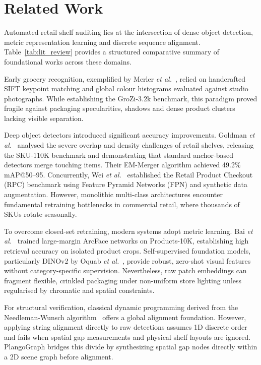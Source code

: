 \documentclass[conference]{IEEEtran}
\begin{document}
\section{Related Work}
Automated retail shelf auditing lies at the intersection of dense object detection, metric representation learning and discrete sequence alignment. Table~\ref{tab:lit_review} provides a structured comparative summary of foundational works across these domains.

Early grocery recognition, exemplified by Merler \textit{et al.}~\cite{merler2007grozi}, relied on handcrafted SIFT keypoint matching and global colour histograms evaluated against studio photographs. While establishing the GroZi-3.2k benchmark, this paradigm proved fragile against packaging specularities, shadows and dense product clusters lacking visible separation.

Deep object detectors introduced significant accuracy improvements. Goldman \textit{et al.}~\cite{goldman2019precise} analysed the severe overlap and density challenges of retail shelves, releasing the SKU-110K benchmark and demonstrating that standard anchor-based detectors merge touching items. Their EM-Merger algorithm achieved 49.2\% mAP@50--95. Concurrently, Wei \textit{et al.}~\cite{wei2019rpc} established the Retail Product Checkout (RPC) benchmark using Feature Pyramid Networks (FPN) and synthetic data augmentation. However, monolithic multi-class architectures encounter fundamental retraining bottlenecks in commercial retail, where thousands of SKUs rotate seasonally.

To overcome closed-set retraining, modern systems adopt metric learning. Bai \textit{et al.}~\cite{bai2020products10k} trained large-margin ArcFace networks on Products-10K, establishing high retrieval accuracy on isolated product crops. Self-supervised foundation models, particularly DINOv2 by Oquab \textit{et al.}~\cite{oquab2023dinov2}, provide robust, zero-shot visual features without category-specific supervision. Nevertheless, raw patch embeddings can fragment flexible, crinkled packaging under non-uniform store lighting unless regularised by chromatic and spatial constraints.

For structural verification, classical dynamic programming derived from the Needleman-Wunsch algorithm~\cite{needleman1970general} offers a global alignment foundation. However, applying string alignment directly to raw detections assumes 1D discrete order and fails when spatial gap measurements and physical shelf layouts are ignored. PlangoGraph bridges this divide by synthesizing spatial gap nodes directly within a 2D scene graph before alignment.
\end{document}
